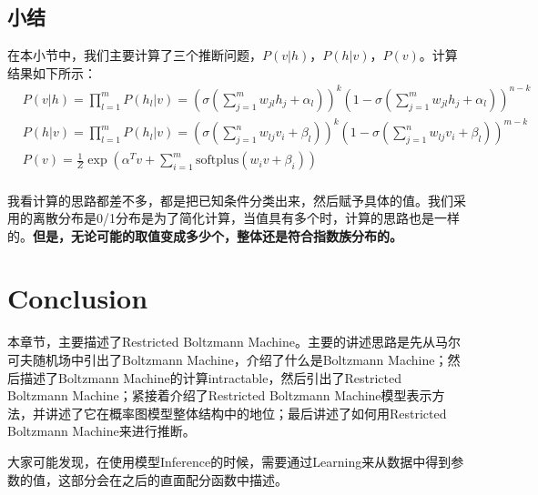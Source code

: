 \documentclass[a4paper]{article}
\begin{document}
\subsection{小结}
在本小节中，我们主要计算了三个推断问题，$P(v|h)$，$P(h|v)$，$P(v)$。计算结果如下所示：
\begin{equation}
    \begin{split}
    & P(v|h) = \prod_{l=1}^m P(h_l|v) = \left( \sigma\left(\sum_{j=1}^m w_{jl}h_j + \alpha_l\right) \right)^k\left(1-\sigma\left(\sum_{j=1}^m w_{jl}h_j + \alpha_l\right)\right)^{n-k} \\
    & P(h|v) = \prod_{l=1}^m P(h_l|v) = \left( \sigma\left(\sum_{j=1}^n w_{lj}v_i + \beta_l\right) \right)^k\left(1-\sigma\left(\sum_{j=1}^n w_{lj}v_i + \beta_l\right)\right)^{m-k} \\
    & P(v)
    =  \frac{1}{Z} \exp\left(\alpha^T v + \sum_{i=1}^m \mathrm{softplus} ( w_iv+\beta_i) \right) \\
    \end{split}
\end{equation}

我看计算的思路都差不多，都是把已知条件分类出来，然后赋予具体的值。我们采用的离散分布是0/1分布是为了简化计算，当值具有多个时，计算的思路也是一样的。\textbf{但是，无论可能的取值变成多少个，整体还是符合指数族分布的。}

\section{Conclusion}
本章节，主要描述了Restricted Boltzmann Machine。主要的讲述思路是先从马尔可夫随机场中引出了Boltzmann Machine，介绍了什么是Boltzmann Machine；然后描述了Boltzmann Machine的计算intractable，然后引出了Restricted Boltzmann Machine；紧接着介绍了Restricted Boltzmann Machine模型表示方法，并讲述了它在概率图模型整体结构中的地位；最后讲述了如何用Restricted Boltzmann Machine来进行推断。

大家可能发现，在使用模型Inference的时候，需要通过Learning来从数据中得到参数的值，这部分会在之后的直面配分函数中描述。
\end{document}
